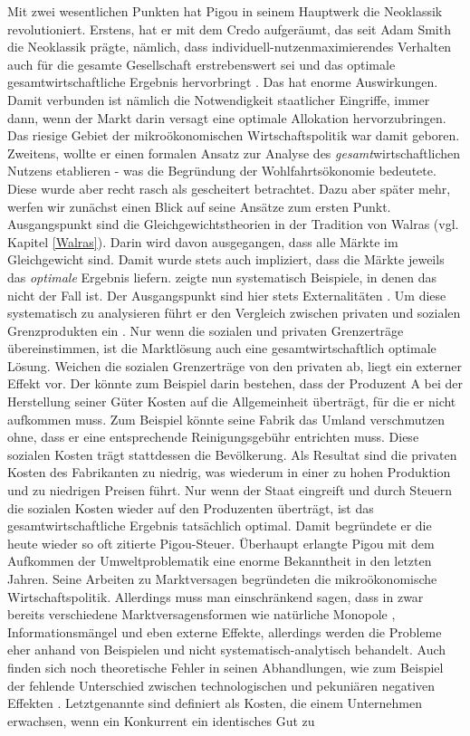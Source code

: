 Mit zwei wesentlichen Punkten hat Pigou in seinem Hauptwerk die Neoklassik revolutioniert. Erstens, hat er mit dem Credo aufgeräumt, das seit Adam Smith die Neoklassik prägte, nämlich, dass individuell-nutzenmaximierendes Verhalten auch für die gesamte Gesellschaft erstrebenswert sei und das optimale gesamtwirtschaftliche Ergebnis hervorbringt \parencite[S. 111]{Pigou1920}. Das hat enorme Auswirkungen. Damit verbunden ist nämlich die Notwendigkeit staatlicher Eingriffe, immer dann, wenn der Markt darin versagt eine optimale Allokation hervorzubringen. Das riesige Gebiet der mikroökonomischen Wirtschaftspolitik war damit geboren. Zweitens, wollte er einen formalen Ansatz zur Analyse des \textit{gesamt}wirtschaftlichen Nutzens etablieren - was die Begründung der Wohlfahrtsökonomie bedeutete. Diese wurde aber recht rasch als gescheitert betrachtet. Dazu aber später mehr, werfen wir zunächst einen Blick auf seine Ansätze zum ersten Punkt. Ausgangspunkt sind die Gleichgewichtstheorien in der Tradition von Walras (vgl. Kapitel \ref{Walras}). Darin wird davon ausgegangen, dass alle Märkte im Gleichgewicht sind. Damit wurde stets auch impliziert, dass die Märkte jeweils das \textit{optimale} Ergebnis liefern. \textcite{Pigou1920} zeigte nun systematisch Beispiele, in denen das nicht der Fall ist. Der Ausgangspunkt sind hier stets Externalitäten \parencite[S. 115]{Pigou1920}. Um diese systematisch zu analysieren führt er den Vergleich zwischen privaten und sozialen Grenzprodukten ein \parencite[S. 114]{Pigou1920}. Nur wenn die sozialen und privaten Grenzerträge übereinstimmen, ist die Marktlösung auch eine gesamtwirtschaftlich optimale Lösung. Weichen die sozialen Grenzerträge von den privaten ab, liegt ein externer Effekt vor. Der könnte zum Beispiel darin bestehen, dass der Produzent A bei der Herstellung seiner Güter Kosten auf die Allgemeinheit überträgt, für die er nicht aufkommen muss. Zum Beispiel könnte seine Fabrik das Umland verschmutzen ohne, dass er eine entsprechende Reinigungsgebühr entrichten muss. Diese sozialen Kosten trägt stattdessen die Bevölkerung. Als Resultat sind die privaten Kosten des Fabrikanten zu niedrig, was wiederum in einer zu hohen Produktion und zu niedrigen Preisen führt. Nur wenn der Staat eingreift und durch Steuern die sozialen Kosten wieder auf den Produzenten überträgt, ist das gesamtwirtschaftliche Ergebnis tatsächlich optimal. Damit begründete er die heute wieder so oft zitierte Pigou-Steuer. Überhaupt erlangte Pigou mit dem Aufkommen der Umweltproblematik eine enorme Bekanntheit in den letzten Jahren. Seine Arbeiten zu Marktversagen begründeten die mikroökonomische Wirtschaftspolitik. Allerdings muss man einschränkend sagen, dass in \textcite{Pigou1920} zwar bereits verschiedene Marktversagensformen wie natürliche Monopole \parencite[S. 240]{Pigou1920}, Informationsmängel \parencite[S. 131]{Pigou1920} und eben externe Effekte, allerdings werden die Probleme eher anhand von Beispielen und nicht systematisch-analytisch behandelt. Auch finden sich noch theoretische Fehler in seinen Abhandlungen, wie zum Beispiel der fehlende Unterschied zwischen technologischen und pekuniären negativen Effekten \parencite[S. 242]{Cansier1989}. Letztgenannte sind definiert als Kosten, die einem Unternehmen erwachsen, wenn ein Konkurrent ein identisches Gut zu 